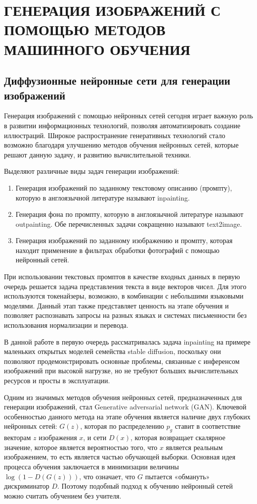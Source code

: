 \chapter{ГЕНЕРАЦИЯ ИЗОБРАЖЕНИЙ С ПОМОЩЬЮ МЕТОДОВ МАШИННОГО ОБУЧЕНИЯ}
\section{Диффузионные нейронные сети для генерации изображений}

Генерация изображений с помощью нейронных сетей сегодня играет важную роль в развитии
информационных технологий, позволяя автоматизировать создание иллюстраций.
Широкое распространение генеративных технологий стало возможно благодаря улучшению методов обучения нейронных
сетей, которые решают данную задачу, и развитию вычислительной техники.

Выделяют различные виды задач генерации изображений:
\begin{enumerate}
  \item Генерация изображений по заданному текстовому описанию (промпту), которую в англоязычной литературе называют inpainting.
  \item Генерация фона по промпту, которую в англоязычной литературе называют outpainting. Обе перечисленных
  задачи сокращенно называют text2image.
  \item Генерация изображений по заданному изображению и промпту, которая находит применение в фильтрах обработки фотографий с помощью нейронный сетей. 
\end{enumerate}

При использовании текстовых промптов в качестве входных данных в первую очередь решается задача представления текста в виде векторов
чисел. 
Для этого используются токенайзеры, возможно, в комбинации с небольшими языковыми моделями.
Данный этап также представляет ценность на этапе обучения и позволяет распознавать запросы на разных языках и системах
письменности без использования нормализации и перевода.

В данной работе в первую очередь рассматривалась задача inpainting на примере маленьких открытых моделей семейства
stable diffusion, поскольку они позволяют продемонстрировать основные проблемы, связанные с инференсом изображений
при высокой нагрузке, но не требуют больших вычислительных ресурсов и просты в эксплуатации.

Одним из значимых методов обучения нейронных сетей, предназначенных для генерации изображений, стал Generative adversarial network (GAN).
Ключевой особенностью данного метода на этапе обучения является наличие двух глубоких нейронных сетей: $G(z)$, которая по распределению $p_g$ ставит
в соответствие векторам $z$ изображения $x$, и сети $D(x)$, которая возвращает скалярное значение,
которое является вероятностью того, что $x$ является реальным изображением, то есть является частью
обучающей выборки. 
Основная идея процесса обучения заключается в минимизации величины $\log (1 - D(G(z)))$, что означает, что $G$ пытается «обмануть» дискриминатор $D$.
Поэтому подобный подход к обучению нейронный сетей можно считать обучением без учителя. 


